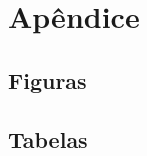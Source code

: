 \documentclass[article]{abntex2}
\begin{document}



% 

\newpage



\newpage
\section{Apêndice}
\subsection{Figuras}
\subsection{Tabelas}
\end{document}

